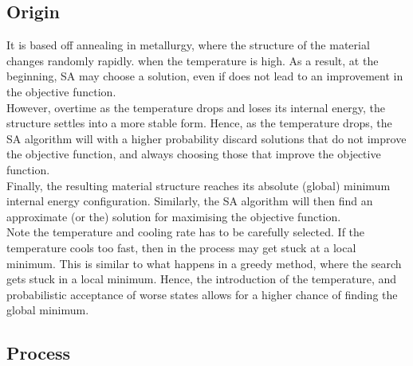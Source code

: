 \documentclass{article}
\begin{document}
\subsection{Origin}
It is based off annealing in metallurgy, where the structure of the material changes randomly rapidly. when the temperature is high.
As a result, at the beginning, SA may choose a solution, even if does not lead to an improvement in the objective function.
\\

However, overtime as the temperature drops and loses its internal energy, the structure settles into a more stable form.
Hence, as the temperature drops, the SA algorithm will with a higher probability discard solutions that do not improve the objective function, and always choosing those that improve the objective function.
\\

Finally, the resulting material structure reaches its absolute (global) minimum internal energy configuration.
Similarly, the SA algorithm will then find an approximate (or the) solution for maximising the objective function.
\\

Note the temperature and cooling rate has to be carefully selected.
If the temperature cools too fast, then in the process may get stuck at a local minimum. 
This is similar to what happens in a greedy method, where the search gets stuck in a local minimum.
Hence, the introduction of the temperature, and probabilistic acceptance of worse states allows for a higher chance of finding the global minimum.
\\

\subsection{Process}

\end{document}

